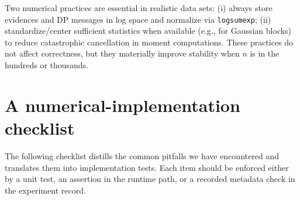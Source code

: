 Two numerical practices are essential in realistic data sets:
(i) always store evidences and DP messages in log space and normalize via \texttt{logsumexp};
(ii) standardize/center sufficient statistics when available (e.g., for Gaussian blocks) to
reduce catastrophic cancellation in moment computations.
These practices do not affect correctness, but they materially improve stability when $n$ is
in the hundreds or thousands.

\section{A numerical-implementation checklist}
\label{sec:alg-checklist}

The following checklist distills the common pitfalls we have encountered and translates them into
implementation tests. Each item should be enforced either by a unit test, an assertion in the
runtime path, or a recorded metadata check in the experiment record.

